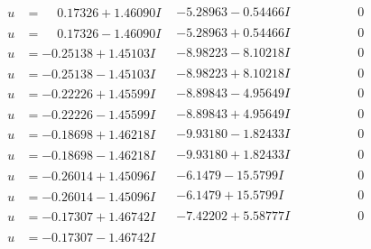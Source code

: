 \documentclass[1p]{elsarticle_modified}
\theoremstyle{definition}
\begin{document}
$$\begin{array}{c|c|c}
\begin{aligned}
u &= \phantom{-}0.17326 + 1.46090 I\end{aligned}
 & -5.28963 - 0.54466 I & \phantom{-0.000000 } 0 \\ \hline\begin{aligned}
u &= \phantom{-}0.17326 - 1.46090 I\end{aligned}
 & -5.28963 + 0.54466 I & \phantom{-0.000000 } 0 \\ \hline\begin{aligned}
u &= -0.25138 + 1.45103 I\end{aligned}
 & -8.98223 - 8.10218 I & \phantom{-0.000000 } 0 \\ \hline\begin{aligned}
u &= -0.25138 - 1.45103 I\end{aligned}
 & -8.98223 + 8.10218 I & \phantom{-0.000000 } 0 \\ \hline\begin{aligned}
u &= -0.22226 + 1.45599 I\end{aligned}
 & -8.89843 - 4.95649 I & \phantom{-0.000000 } 0 \\ \hline\begin{aligned}
u &= -0.22226 - 1.45599 I\end{aligned}
 & -8.89843 + 4.95649 I & \phantom{-0.000000 } 0 \\ \hline\begin{aligned}
u &= -0.18698 + 1.46218 I\end{aligned}
 & -9.93180 - 1.82433 I & \phantom{-0.000000 } 0 \\ \hline\begin{aligned}
u &= -0.18698 - 1.46218 I\end{aligned}
 & -9.93180 + 1.82433 I & \phantom{-0.000000 } 0 \\ \hline\begin{aligned}
u &= -0.26014 + 1.45096 I\end{aligned}
 & -6.1479 - 15.5799 I & \phantom{-0.000000 } 0 \\ \hline\begin{aligned}
u &= -0.26014 - 1.45096 I\end{aligned}
 & -6.1479 + 15.5799 I & \phantom{-0.000000 } 0 \\ \hline\begin{aligned}
u &= -0.17307 + 1.46742 I\end{aligned}
 & -7.42202 + 5.58777 I & \phantom{-0.000000 } 0 \\ \hline\begin{aligned}
u &= -0.17307 - 1.46742 I\end{aligned}

\end{array}$$
\end{document}
